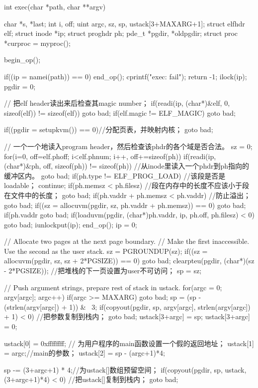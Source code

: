 \documentclass{swfuthesism}
\begin{document}
\begin{ccode}
int exec(char *path, char **argv)
{
  char *s, *last;
  int i, off;
  uint argc, sz, sp, ustack[3+MAXARG+1];
  struct elfhdr elf;
  struct inode *ip;
  struct proghdr ph;
  pde_t *pgdir, *oldpgdir;
  struct proc *curproc = myproc();

  begin_op();

  if((ip = namei(path)) == 0){
    end_op();
    cprintf("exec: fail\n");
    return -1;
  }
  ilock(ip);
  pgdir = 0;

  // 把elf header读出来后检查其magic number；
  if(readi(ip, (char*)&elf, 0, sizeof(elf)) != sizeof(elf))
    goto bad;
  if(elf.magic != ELF_MAGIC)
    goto bad;

  if((pgdir = setupkvm()) == 0)//分配页表，并映射内核；
    goto bad;

  // 一个一个地读入program header，然后检查该phdr的各个域是否合法。
  sz = 0;
  for(i=0, off=elf.phoff; i<elf.phnum; i++, off+=sizeof(ph)){
    if(readi(ip, (char*)&ph, off, sizeof(ph)) != sizeof(ph)) //从inode里读入一个phdr到ph指向的缓冲区内。
      goto bad;
    if(ph.type != ELF_PROG_LOAD) //该段是否是loadable；
      continue;
    if(ph.memsz < ph.filesz) //段在内存中的长度不应该小于段在文件中的长度；
      goto bad;
    if(ph.vaddr + ph.memsz < ph.vaddr) //防止溢出；
      goto bad;
    if((sz = allocuvm(pgdir, sz, ph.vaddr + ph.memsz)) == 0) 
      goto bad;
    if(ph.vaddr %
      goto bad;
    if(loaduvm(pgdir, (char*)ph.vaddr, ip, ph.off, ph.filesz) < 0) 
      goto bad;
  }
  iunlockput(ip);
  end_op();
  ip = 0;

  // Allocate two pages at the next page boundary.
  // Make the first inaccessible.  Use the second as the user stack.
  sz = PGROUNDUP(sz);
  if((sz = allocuvm(pgdir, sz, sz + 2*PGSIZE)) == 0)
    goto bad;
  clearpteu(pgdir, (char*)(sz - 2*PGSIZE)); //把堆栈的下一页设置为user不可访问；
  sp = sz;

  // Push argument strings, prepare rest of stack in ustack.
  for(argc = 0; argv[argc]; argc++) {
    if(argc >= MAXARG)
      goto bad;
    sp = (sp - (strlen(argv[argc]) + 1)) & ~3; 
    if(copyout(pgdir, sp, argv[argc], strlen(argv[argc]) + 1) < 0) //把参数复制到栈内；
      goto bad;
    ustack[3+argc] = sp;
  }
  ustack[3+argc] = 0;

  ustack[0] = 0xffffffff;  // 为用户程序的main函数设置一个假的返回地址；
  ustack[1] = argc;//main的参数；
  ustack[2] = sp - (argc+1)*4;  

  sp -= (3+argc+1) * 4;//为ustack[]数组预留空间；
  if(copyout(pgdir, sp, ustack, (3+argc+1)*4) < 0) //把ustack[]复制到栈内；
    goto bad;

}
\end{ccode}
\end{document}
